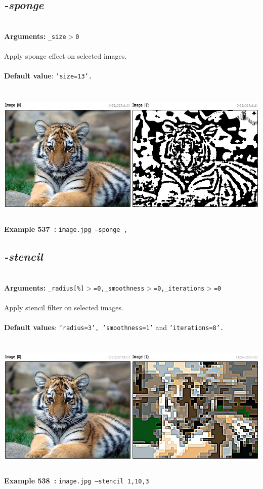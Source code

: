 \documentclass[a4paper,11pt,twoside]{book}
\begin{document}
\subsection{\emph{-sponge} }\vspace*{-0.5em}
~\\\textbf{Arguments: } 
{\small \texttt{\_size$>$0}}\\~\\
Apply sponge effect on selected images.
~\\~\\\textbf{Default value}: {\small \texttt{'size=13'.}}
\begin{center}\includegraphics[keepaspectratio=true,height=7cm,width=\textwidth]{img/gmic_def537.jpg}\\
{\footnotesize \textbf{Example 537~:} \texttt{image.jpg --sponge ,}}
\end{center}

\subsection{\emph{-stencil} }\vspace*{-0.5em}
~\\\textbf{Arguments: } 
{\small \texttt{\_radius[\%]$>$=0,\_smoothness$>$=0,\_iterations$>$=0}}\\~\\
Apply stencil filter on selected images.
~\\~\\\textbf{Default values}: {\small \texttt{'radius=3', 'smoothness=1'} and \texttt{'iterations=8'.}}
\begin{center}\includegraphics[keepaspectratio=true,height=7cm,width=\textwidth]{img/gmic_def538.jpg}\\
{\footnotesize \textbf{Example 538~:} \texttt{image.jpg --stencil 1,10,3}}
\end{center}
\end{document}
